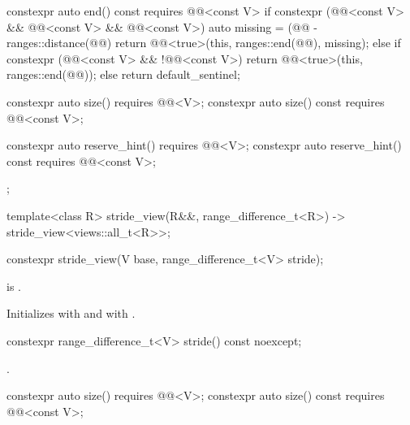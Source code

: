 \begin{codeblock}
{{    constexpr auto end() const requires @@<const V> {
      if constexpr (@@<const V> && @@<const V> && @@<const V>) {
        auto missing = (@@ - ranges::distance(@@) %
        return @@<true>(this, ranges::end(@@), missing);
      } else if constexpr (@@<const V> && !@@<const V>) {
        return @@<true>(this, ranges::end(@@));
      } else {
        return default_sentinel;
      }
    }

    constexpr auto size() requires @@<V>;
    constexpr auto size() const requires @@<const V>;

    constexpr auto reserve_hint() requires @@<V>;
    constexpr auto reserve_hint() const requires @@<const V>;
  };

  template<class R>
    stride_view(R&&, range_difference_t<R>) -> stride_view<views::all_t<R>>;
}
\end{codeblock}

%
\begin{itemdecl}
constexpr stride_view(V base, range_difference_t<V> stride);
\end{itemdecl}

\begin{itemdescr}
\pnum
\expects
{} is .

\pnum
\effects
Initializes  with  and
 with .
\end{itemdescr}

%
\begin{itemdecl}
constexpr range_difference_t<V> stride() const noexcept;
\end{itemdecl}

\begin{itemdescr}
\pnum
\returns
{}.
\end{itemdescr}

%
\begin{itemdecl}
constexpr auto size() requires @@<V>;
constexpr auto size() const requires @@<const V>;
\end{itemdecl}

